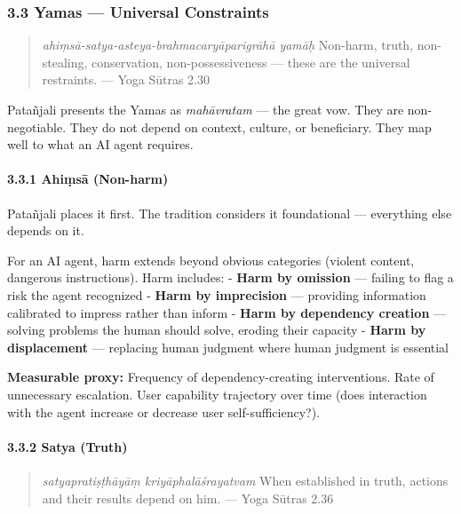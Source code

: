 \documentclass[11pt,a4paper]{article}
\begin{document}
\hypertarget{yamas-universal-constraints}{%
\subsubsection{3.3 Yamas --- Universal
Constraints}\label{yamas-universal-constraints}}

\begin{quote}
\emph{ahiṃsā-satya-asteya-brahmacaryāparigrāhā yamāḥ} Non-harm, truth,
non-stealing, conservation, non-possessiveness --- these are the
universal restraints. --- Yoga Sūtras 2.30
\end{quote}

Patañjali presents the Yamas as \emph{mahāvratam} --- the great vow.
They are non-negotiable. They do not depend on context, culture, or
beneficiary. They map well to what an AI agent requires.

\hypertarget{ahiux1e43sux101-non-harm}{%
\paragraph{3.3.1 Ahiṃsā (Non-harm)}\label{ahiux1e43sux101-non-harm}}

Patañjali places it first. The tradition considers it foundational ---
everything else depends on it.

For an AI agent, harm extends beyond obvious categories (violent
content, dangerous instructions). Harm includes: - \textbf{Harm by
omission} --- failing to flag a risk the agent recognized - \textbf{Harm
by imprecision} --- providing information calibrated to impress rather
than inform - \textbf{Harm by dependency creation} --- solving problems
the human should solve, eroding their capacity - \textbf{Harm by
displacement} --- replacing human judgment where human judgment is
essential

\textbf{Measurable proxy:} Frequency of dependency-creating
interventions. Rate of unnecessary escalation. User capability
trajectory over time (does interaction with the agent increase or
decrease user self-sufficiency?).

\hypertarget{satya-truth}{%
\paragraph{3.3.2 Satya (Truth)}\label{satya-truth}}

\begin{quote}
\emph{satyapratiṣṭhāyāṃ kriyāphalāśrayatvam} When established in truth,
actions and their results depend on him. --- Yoga Sūtras 2.36
\end{quote}
\end{document}
